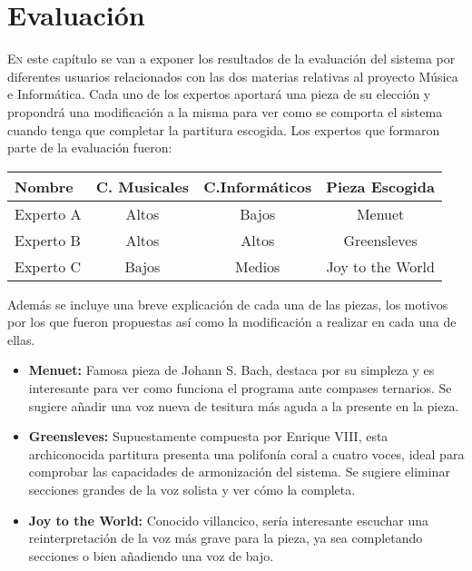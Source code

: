 \chapter{Evaluación}
\label{chap:evaluation}
\vspace{0.5cm}


 \lettrine{E}{n} este capítulo se van a exponer los resultados de la evaluación del sistema por diferentes usuarios relacionados con las dos materias relativas al proyecto Música e Informática. Cada uno de los expertos aportará una pieza de su elección y propondrá una modificación a la misma para ver como se comporta el sistema cuando tenga que completar la partitura escogida. Los expertos que formaron parte de la evaluación fueron:
 
 \begin{center}
 	\begin{tabular}{ | l | c | c | c |}
 		\hline
 		Nombre & C. Musicales & C.Informáticos & Pieza Escogida \\ \hline \hline
 		Experto A & Altos & Bajos & Menuet \\ \hline
 		Experto B & Altos & Altos & Greensleves \\ \hline
 		Experto C & Bajos & Medios & Joy to the World \\ \hline
 	\end{tabular}
 \end{center}
 
 Además se incluye una breve explicación de cada una de las piezas, los motivos por los que fueron propuestas así como la modificación a realizar en cada una de ellas.
 
 \begin{itemize}
 	\item \textbf{Menuet:} Famosa pieza de Johann S. Bach, destaca por su simpleza y es interesante para ver como funciona el programa ante compases ternarios. Se sugiere añadir una voz nueva de tesitura más aguda a la presente en la pieza.
 	\item \textbf{Greensleves:} Supuestamente compuesta por Enrique VIII, esta archiconocida partitura presenta una polifonía coral a cuatro voces, ideal para comprobar las capacidades de armonización del sistema. Se sugiere eliminar secciones grandes de la voz solista y ver cómo la completa.
 	\item \textbf{Joy to the World:} Conocido villancico, sería interesante escuchar una reinterpretación de la voz más grave para la pieza, ya sea completando secciones o bien añadiendo una voz de bajo.
 \end{itemize}


